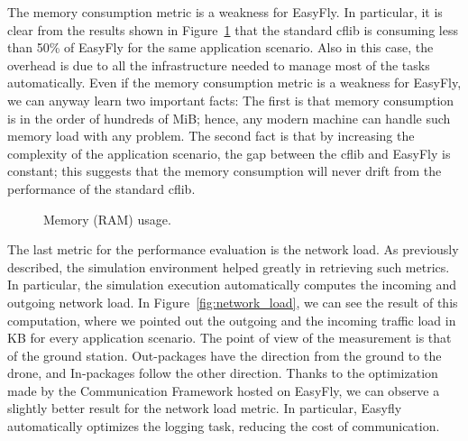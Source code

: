 The memory consumption metric is a weakness for EasyFly. 
In particular, it is clear from the results shown in Figure~\ref{fig:ram_usage} that the standard cflib is consuming less than 50\% of EasyFly for the same application scenario.
Also in this case, the overhead is due to all the infrastructure needed to manage most of the tasks automatically.
Even if the memory consumption metric is a weakness for EasyFly, we can anyway learn two important facts:
The first is that memory consumption is in the order of hundreds of MiB; hence, any modern machine can handle such memory load with any problem.
The second fact is that by increasing the complexity of the application scenario, the gap between the cflib and EasyFly is constant; 
this suggests that the memory consumption will never drift from the performance of the standard cflib.

\begin{figure}[t]
    \centering
    \quad
    \quad
    \quad
    \caption{Memory (RAM) usage.}\label{fig:ram_usage}
\end{figure}


The last metric for the performance evaluation is the network load. As previously described, the simulation environment helped greatly in retrieving such metrics. 
In particular, the simulation execution automatically computes the incoming and outgoing network load. 
In Figure~\ref{fig:network_load}, we can see the result of this computation, where we pointed out the outgoing and the incoming traffic load in KB for every application scenario.
The point of view of the measurement is that of the ground station. Out-packages have the direction from the ground to the drone, and In-packages follow the other direction. 
Thanks to the optimization made by the Communication Framework hosted on EasyFly, we can observe a slightly better result for the network load metric.
In particular, Easyfly automatically optimizes the logging task, reducing the cost of communication.

